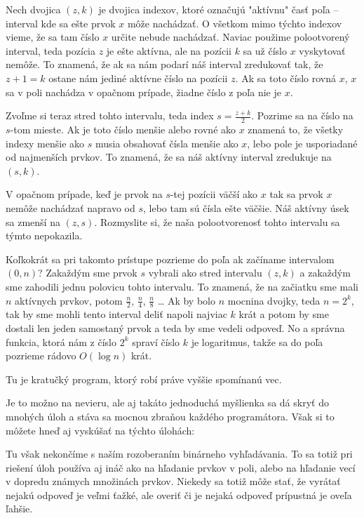 Nech dvojica $(z, k)$ je dvojica indexov, ktoré označujú "aktívnu" časť poľa -- interval kde sa ešte
prvok $x$ môže nachádzať. O všetkom mimo týchto indexov vieme, že sa tam číslo $x$ určite nebude
nachádzať. Naviac použime polootvorený interval, teda pozícia $z$ je ešte aktívna, ale na pozícii
$k$ sa už číslo $x$ vyskytovať nemôže. To znamená, že ak sa nám podarí náš interval zredukovať tak,
že $z+1 = k$ ostane nám jediné aktívne číslo na pozícii $z$. Ak sa toto číslo rovná $x$, $x$ sa v
poli nachádza v opačnom prípade, žiadne číslo z poľa nie je $x$.

Zvoľme si teraz stred tohto intervalu, teda index $s = \frac{z+k}{2}$. Pozrime sa na číslo na
$s$-tom mieste. Ak je toto číslo menšie alebo rovné ako $x$ znamená to, že všetky indexy menšie ako
$s$ musia obsahovať čísla menšie ako $x$, lebo pole je usporiadané od najmenších prvkov. To znamená,
že sa náš aktívny interval zredukuje na $(s, k)$.

V opačnom prípade, keď je prvok na $s$-tej pozícii väčší ako $x$ tak sa prvok $x$ nemôže nachádzať
napravo od $s$, lebo tam sú čísla ešte väčšie. Náš aktívny úsek sa zmenší na $(z, s)$. Rozmyslite
si, že naša polootvorenosť tohto intervalu sa týmto nepokazila.

Koľkokrát sa pri takomto prístupe pozrieme do poľa ak začíname intervalom $(0, n)$? Zakaždým sme prvok $s$ vybrali ako stred
intervalu $(z, k)$ a zakaždým sme zahodili jednu polovicu tohto intervalu. To znamená, že na
začiatku sme mali $n$ aktívnych prvkov, potom $\frac{n}{2}$, $\frac{n}{4}$, $\frac{n}{8}$ \dots
Ak by bolo $n$ mocnina dvojky, teda $n = 2^k$, tak by sme mohli tento interval deliť napoli najviac
$k$ krát a potom by sme dostali len jeden samostaný prvok a teda by sme vedeli odpoveď. No a správna
funkcia, ktorá nám z číslo $2^k$ spraví číslo $k$ je logaritmus, takže sa do poľa pozrieme rádovo
$O(\log n)$ krát.

Tu je kratučký program, ktorý robí práve vyššie spomínanú vec.


Je to možno na nevieru, ale aj takáto jednoduchá myšlienka sa dá skryť do mnohých úloh a stáva sa
mocnou zbraňou každého programátora. Však si to môžete hneď aj vyskúšať na týchto úlohách:


Tu však nekončíme s naším rozoberaním binárneho vyhľadávania. To sa totiž pri riešení úloh používa
aj ináč ako na hľadanie prvkov v poli, alebo na hľadanie vecí v dopredu známych množinách prvkov.
Niekedy sa totiž môže stať, že vyrátať nejakú odpoveď je veľmi ťažké, ale overiť či je nejaká
odpoveď prípustná je oveľa ľahšie.

